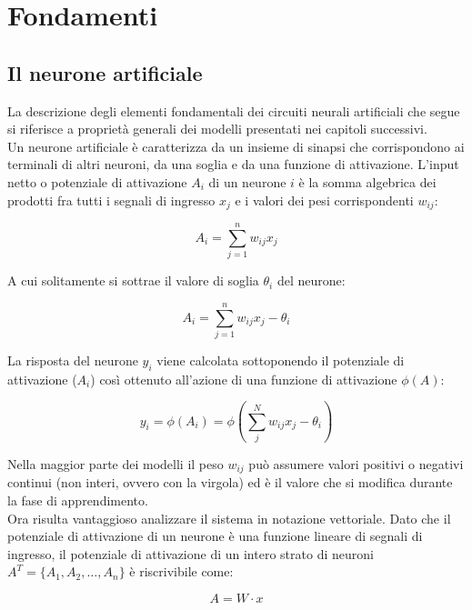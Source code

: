 \section{Fondamenti}

\subsection{Il neurone artificiale}

La descrizione degli elementi fondamentali dei circuiti neurali artificiali che
segue si riferisce a proprietà generali dei modelli presentati nei capitoli
successivi.\\
Un neurone artificiale è caratterizza da un insieme di sinapsi che corrispondono
ai terminali di altri neuroni, da una soglia e da una funzione di attivazione.
L'input netto o potenziale di attivazione $A_i$ di un neurone $i$ è la somma
algebrica dei prodotti fra tutti i segnali di ingresso $x_j$ e i valori dei pesi
corrispondenti $w_{ij}$:

\begin{equation*}
	A_i = \sum_{j=1}^{n} w_{ij}x_j
\end{equation*}

A cui solitamente si sottrae il valore di soglia $\theta_i$ del neurone:

\begin{equation*}
	A_i = \sum_{j=1}^{n} w_{ij}x_j - \theta_i
\end{equation*}

La risposta del neurone $y_i$ viene calcolata sottoponendo il potenziale di
attivazione ($A_i$) così ottenuto all'azione di una funzione di attivazione
$\phi(A)$:

\begin{equation*}
	y_i = \phi(A_i) = \phi(\sum_j^N w_{ij}x_j - \theta_i)
\end{equation*}

Nella maggior parte dei modelli il peso $w_{ij}$ può assumere valori positivi o
negativi continui (non interi, ovvero con la virgola) ed è il valore che si
modifica durante la fase di apprendimento.\\
Ora risulta vantaggioso analizzare il sistema in notazione vettoriale. Dato che
il potenziale di attivazione di un neurone è una funzione lineare di segnali di
ingresso, il potenziale di attivazione di un intero strato di neuroni $A^T = \{
	A_1, A_2, \ldots, A_n \}$ è riscrivibile come:

\begin{equation*}
	A = W \cdot x
\end{equation*}

